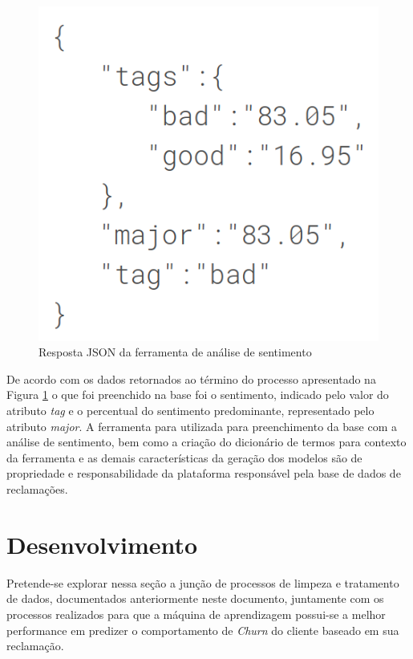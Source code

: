 \documentclass[12pt]{article}
\begin{document}
\begin{figure}[ht]
\centering
\includegraphics[scale=0.3]{fig/json_sentiment.png}
\caption{Resposta JSON da ferramenta de análise de sentimento}
\label{fig:json_sentiment}
\end{figure}

De acordo com os dados retornados ao término do processo apresentado na Figura \ref{fig:json_sentiment} o que foi preenchido na base foi o sentimento, indicado pelo valor do atributo \emph{tag} e o percentual do sentimento predominante, representado pelo atributo \emph{major}. A ferramenta para utilizada para preenchimento da base com a análise de sentimento, bem como a criação do dicionário de termos para contexto da ferramenta e as demais características da geração dos modelos são de propriedade e responsabilidade da plataforma responsável pela base de dados de reclamações.

\section{Desenvolvimento}\label{sec:develop}

Pretende-se explorar nessa seção a junção de processos de limpeza e tratamento de dados, documentados anteriormente neste documento, juntamente com os processos realizados para que a máquina de aprendizagem possui-se a melhor performance em predizer o comportamento de \emph{Churn} do cliente baseado em sua reclamação.
\end{document}

